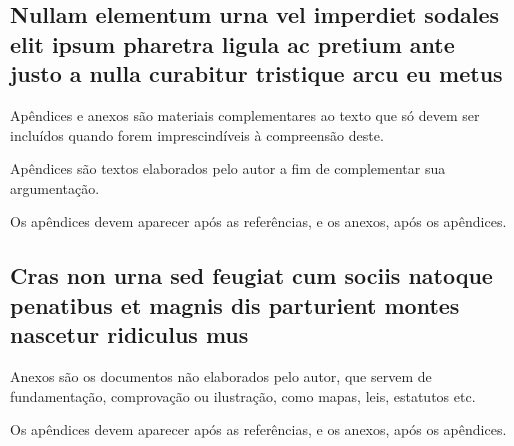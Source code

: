 \documentclass[
	article,			%
	12pt,				%
	oneside,			%
	a4paper,			%
    BIBLATEX,           %
	english,			%
	brazil,				%
	sumario=tradicional
	]{abntex2}
\begin{document}

\newpage
\begin{apendicesenv}

\chapter{Nullam elementum urna vel imperdiet sodales elit ipsum pharetra ligula
ac pretium ante justo a nulla curabitur tristique arcu eu metus}
Apêndices e anexos são materiais complementares ao texto que só devem ser incluídos quando forem imprescindíveis à compreensão deste.

Apêndices são textos elaborados pelo autor a fim de complementar sua argumentação.

Os apêndices devem aparecer após as referências, e os anexos, após os apêndices.

\end{apendicesenv}

\newpage
\begin{anexosenv}

\chapter{Cras non urna sed feugiat cum sociis natoque penatibus et magnis dis
parturient montes nascetur ridiculus mus}

Anexos são os documentos não elaborados pelo autor, que servem de fundamentação, comprovação ou ilustração, como mapas, leis, estatutos etc.

Os apêndices devem aparecer após as referências, e os anexos, após os apêndices.

\end{anexosenv}
\end{document}
